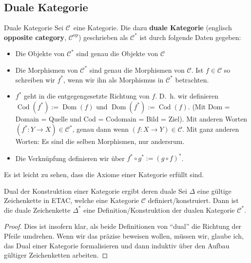 \documentclass[a4paper]{amsart}
\theoremstyle{definition}
\DeclareMathOperator{\Dom}{Dom}
\DeclareMathOperator{\Cod}{Cod}
\newcommand{\CC}{\ensuremath{\mathcal{ C }}}
\begin{document}
\subsection{Duale Kategorie}
\begin{Definition}{Duale Kategorie}
   Sei \CC\ eine Kategorie. Die dazu \textbf{duale Kategorie} (englisch \textbf{opposite category}, $\CC^\text{op}$) geschrieben als $\CC^*$ ist durch folgende Daten gegeben:
   \begin{itemize}
      \item Die Objekte von $\CC^*$ sind genau die Objekte von $\CC$
      \item Die Morphismen von $\CC^*$ sind genau die Morphismen von $\CC$. Ist $f \in \CC$ so schreiben wir $f^*$, wenn wir ihn als Morphismus in $\CC^*$ betrachten.
      \item $f^*$ geht in die entgegengesetzte Richtung von $f$. D.~h. wir definieren $\Cod(f^*) := \Dom(f)$ und $\Dom(f^*) := \Cod(f)$. (Mit Dom = Domain = Quelle und Cod = Codomain = Bild = Ziel). Mit anderen Worten $(f^* \colon Y \to X) \in \CC^*$, genau dann wenn $(f \colon X \to Y) \in \CC$. Mit ganz anderen Worten: Es sind die selben Morphismen, nur andersrum.
      \item Die Verknüpfung definieren wir über $f^* \circ g^* := (g \circ f)^*$.
   \end{itemize}
\end{Definition}   
Es ist leicht zu sehen, dass die Axiome einer Kategorie erfüllt sind.

\begin{Satz}{Dual der Konstruktion einer Kategorie ergibt deren duale}
   Sei $\Delta$ eine gültige Zeichenkette in ETAC, welche eine Kategorie $\CC$ definiert/konstruiert. Dann ist die duale Zeichenkette $\Delta^*$ eine Definition/Konstruktion der dualen Kategorie $\CC^*$.
\end{Satz}
\begin{proof}
   Dies ist insofern klar, als beide Definitionen von "`dual"' die Richtung der Pfeile umdrehen. Wenn wir das präzise beweisen wollen, müssen wir, glaube ich, das Dual einer Kategorie formalisieren und dann induktiv über den Aufbau gültiger Zeichenketten arbeiten.
\end{proof}
\end{document}
